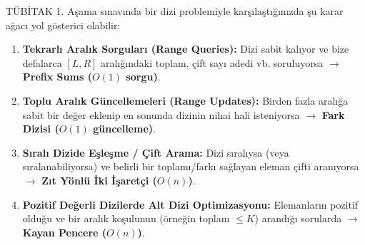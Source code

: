 TÜBİTAK 1. Aşama sınavında bir dizi problemiyle karşılaştığınızda şu karar ağacı yol gösterici olabilir:

\begin{enumerate}
    \item \textbf{Tekrarlı Aralık Sorguları (Range Queries):} Dizi sabit kalıyor ve bize defalarca $[L, R]$ aralığındaki toplam, çift sayı adedi vb. soruluyorsa $\rightarrow$ \textbf{Prefix Sums ($O(1)$ sorgu)}.
    \item \textbf{Toplu Aralık Güncellemeleri (Range Updates):} Birden fazla aralığa sabit bir değer eklenip en sonunda dizinin nihai hali isteniyorsa $\rightarrow$ \textbf{Fark Dizisi ($O(1)$ güncelleme)}.
    \item \textbf{Sıralı Dizide Eşleşme / Çift Arama:} Dizi sıralıysa (veya sıralanabiliyorsa) ve belirli bir toplamı/farkı sağlayan eleman çifti aranıyorsa $\rightarrow$ \textbf{Zıt Yönlü İki İşaretçi ($O(n)$)}.
    \item \textbf{Pozitif Değerli Dizilerde Alt Dizi Optimizasyonu:} Elemanların pozitif olduğu ve bir aralık koşulunun (örneğin toplam $\le K$) arandığı sorularda $\rightarrow$ \textbf{Kayan Pencere ($O(n)$)}.
\end{enumerate}
